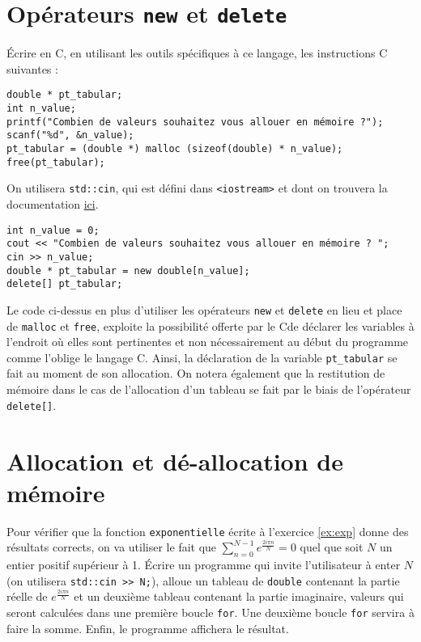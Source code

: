 \documentclass{book}
\newcommand{\inline}[1]{\texttt{#1}}
\newcommand{\cpp}{\mbox{C\vspace{.5em}\protect\raisebox{.2ex}{\footnotesize++~}}}
\begin{document}
\section{Opérateurs \texttt{new} et \texttt{delete}}

Écrire en \cpp, en utilisant les outils spécifiques à ce langage, les
instructions C suivantes :

\begin{verbatim}
double * pt_tabular;
int n_value;
printf("Combien de valeurs souhaitez vous allouer en mémoire ?");
scanf("%d", &n_value);
pt_tabular = (double *) malloc (sizeof(double) * n_value);
free(pt_tabular);
\end{verbatim}

On utilisera \inline{std::cin}, qui est défini dans \inline{<iostream>} et dont on trouvera la documentation \href{https://en.cppreference.com/w/cpp/io/cin}{ici}.

\begin{correction}

\begin{verbatim}
int n_value = 0;
cout << "Combien de valeurs souhaitez vous allouer en mémoire ? ";
cin >> n_value;
double * pt_tabular = new double[n_value];
delete[] pt_tabular;
\end{verbatim}

Le code ci-dessus en plus d'utiliser les opérateurs \texttt{new} et \texttt{delete} en lieu et
place de \texttt{malloc} et \texttt{free}, exploite la possibilité offerte par le \cpp de déclarer
les variables à l'endroit où elles sont pertinentes et non nécessairement au
début du programme comme l'oblige le langage C. Ainsi, la déclaration de la
variable \texttt{pt\_tabular} se fait au moment de son allocation. On notera également
que la restitution de mémoire dans le cas de l'allocation d'un tableau se fait
par le biais de l'opérateur \texttt{delete[]}.
\end{correction}


\section{Allocation et dé-allocation de mémoire} \label{ex:sum_exp}

Pour vérifier que la fonction \inline{exponentielle} écrite à l'exercice \ref{ex:exp} donne des résultats corrects, on va utiliser le fait que $\sum_{n=0}^{N-1} 
e^{\frac{2i\pi n}{N}} = 0$ quel que soit $N$ un entier positif supérieur à 1. Écrire un programme qui invite l'utilisateur à enter $N$ (on utilisera \inline{std::cin >> N;}), alloue un tableau de \inline{double} contenant la partie réelle de 
$e^{\frac{2i\pi n}{N}}$ et un  deuxième tableau contenant la partie imaginaire, valeurs qui seront calculées dans une première boucle \inline{for}. Une deuxième 
boucle \inline{for} servira à faire la somme. Enfin, le programme affichera le résultat.
\end{document}
